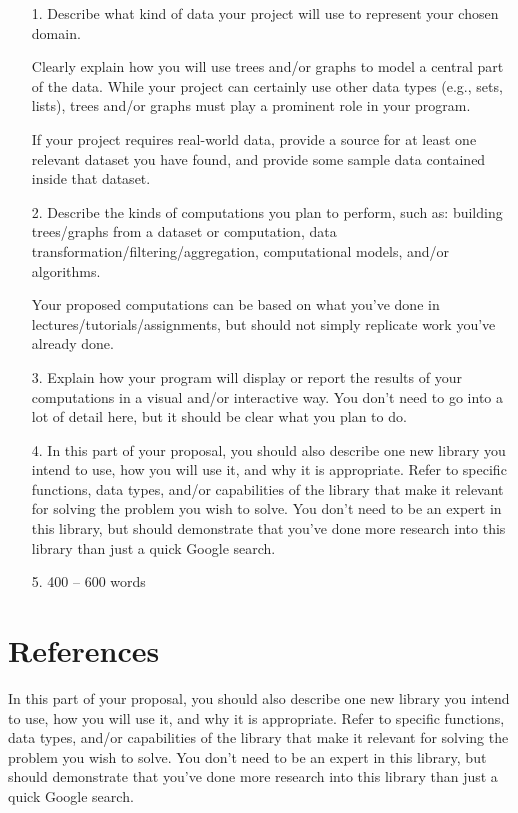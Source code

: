 \documentclass[fontsize=11pt]{article}
\begin{document}
\begin{enumerate}
    \item[1.]
    Describe what kind of data your project will use to represent your chosen domain.
    
    Clearly explain how you will use trees and/or graphs to model a central part of the data. While your project can certainly use other data types (e.g., sets, lists), trees and/or graphs must play a prominent role in your program.
    
    If your project requires real-world data, provide a source for at least one relevant dataset you have found, and provide some sample data contained inside that dataset.

    \item[2.]
    Describe the kinds of computations you plan to perform, such as: building trees/graphs from a dataset or computation, data transformation/filtering/aggregation, computational models, and/or algorithms.
   
    Your proposed computations can be based on what you’ve done in lectures/tutorials/assignments, but should not simply replicate work you’ve already done.
    
    \item[3.]
    Explain how your program will display or report the results of your computations in a visual and/or interactive way. You don’t need to go into a lot of detail here, but it should be clear what you plan to do.
    
    \item[4.]
    In this part of your proposal, you should also describe one new library you intend to use, how you will use it, and why it is appropriate. Refer to specific functions, data types, and/or capabilities of the library that make it relevant for solving the problem you wish to solve. You don’t need to be an expert in this library, but should demonstrate that you’ve done more research into this library than just a quick Google search.

    \item[5.] 
    400 – 600 words
\end{enumerate}



\section*{References}

In this part of your proposal, you should also describe one new library you intend to use, how you will use it, and why it is appropriate. Refer to specific functions, data types, and/or capabilities of the library that make it relevant for solving the problem you wish to solve. You don’t need to be an expert in this library, but should demonstrate that you’ve done more research into this library than just a quick Google search.
\end{document}
